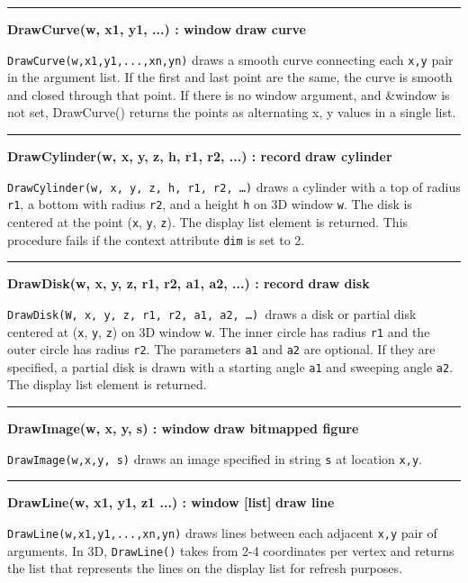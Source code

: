 \bigskip\hrule\vspace{0.1cm}
\noindent
{\bf DrawCurve(w, x1, y1, ...) : window } \hfill {\bf draw curve}

\noindent
\texttt{DrawCurve(w,x1,y1,...,xn,yn)} draws a smooth curve connecting
each \texttt{x,y} pair in the argument list. If the first and last
point are the same, the curve is smooth and closed through that point.
If there is no window argument, and \&window is not set, DrawCurve()
returns the points as alternating x, y values in a single list.

\bigskip\hrule\vspace{0.1cm}
\noindent
{\bf DrawCylinder(w, x, y, z, h, r1, r2, ...) : record } \hfill {\bf draw cylinder}

\noindent
\texttt{DrawCylinder(w, x, y, z, h, r1, r2, {\dots})} draws a cylinder
with a top of radius \texttt{r1}, a bottom with radius \texttt{r2}, and
a height \texttt{h} on 3D window \texttt{w}. The disk is centered at
the point (\texttt{x}, \texttt{y}, \texttt{z}). The display list
element is returned. This procedure fails if the context attribute
\texttt{dim} is set to 2.

\bigskip\hrule\vspace{0.1cm}
\noindent
{\bf DrawDisk(w, x, y, z, r1, r2, a1, a2, ...) : record } \hfill {\bf draw disk}

\noindent
\texttt{DrawDisk(W, x, y, z, r1, r2, a1, a2, {\dots})}\texttt{ }draws a
disk or partial disk centered at (\texttt{x}, \texttt{y}, \texttt{z})
on 3D window \texttt{w}. The inner circle has radius \texttt{r1} and
the outer circle has radius \texttt{r2}. The parameters \texttt{a1} and
\texttt{a2} are optional. If they are specified, a partial disk is
drawn with a starting angle \texttt{a1} and sweeping angle \texttt{a2}.
The display list element is returned.

\bigskip\hrule\vspace{0.1cm}
\noindent
{\bf DrawImage(w, x, y, s) : window } \hfill {\bf draw bitmapped figure}

\noindent
\texttt{DrawImage(w,x,y, s)} draws an image specified in string
\texttt{s} at location \texttt{x,y}.

\bigskip\hrule\vspace{0.1cm}
\noindent
{\bf DrawLine(w, x1, y1, z1 ...) : window [list] } \hfill {\bf draw line}

\noindent
\texttt{DrawLine(w,x1,y1,...,xn,yn)} draws lines between each adjacent
\texttt{x,y} pair of arguments. In 3D, \texttt{DrawLine()} takes from
2-4 coordinates per vertex and returns the list that represents the
lines on the display list for refresh purposes.

